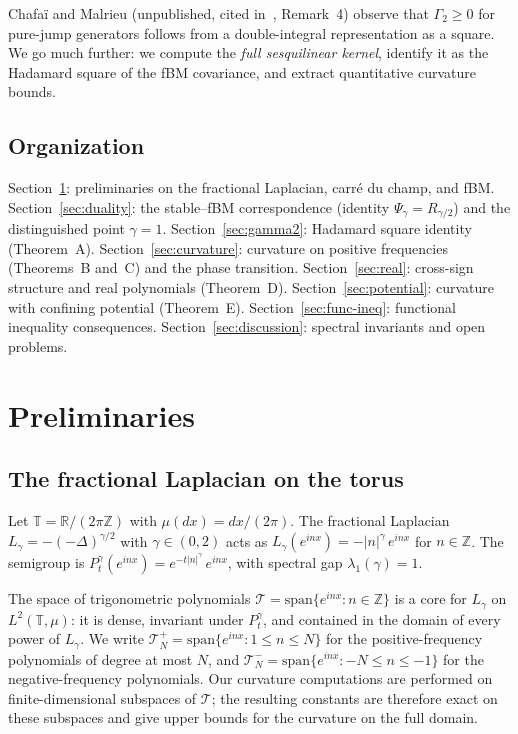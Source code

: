 \documentclass[11pt,a4paper]{article}
\theoremstyle{plain}
\theoremstyle{definition}
\theoremstyle{remark}
\newcommand{\R}{\mathbb{R}}
\newcommand{\Z}{\mathbb{Z}}
\newcommand{\T}{\mathbb{T}}
\begin{document}
Chafa\"i and Malrieu (unpublished, cited in~\cite{GentilImbert2008},
Remark~4) observe that $\Gamma_2 \geq 0$ for pure-jump generators
follows from a double-integral representation as a square. We go
much further: we compute the \emph{full sesquilinear kernel}, identify
it as the Hadamard square of the fBM covariance, and extract
quantitative curvature bounds.


\subsection{Organization}

Section~\ref{sec:prelim}: preliminaries on the fractional Laplacian,
carr\'e du champ, and fBM.
Section~\ref{sec:duality}: the stable--fBM correspondence (identity
$\Psi_\gamma = R_{\gamma/2}$) and the distinguished point $\gamma = 1$.
Section~\ref{sec:gamma2}: Hadamard square identity (Theorem~A).
Section~\ref{sec:curvature}: curvature on positive frequencies
(Theorems~B and~C) and the phase transition.
Section~\ref{sec:real}: cross-sign structure and real polynomials
(Theorem~D).
Section~\ref{sec:potential}: curvature with confining potential
(Theorem~E).
Section~\ref{sec:func-ineq}: functional inequality consequences.
Section~\ref{sec:discussion}: spectral invariants and open problems.


\section{Preliminaries}\label{sec:prelim}

\subsection{The fractional Laplacian on the torus}

Let $\T = \R/(2\pi\Z)$ with $\mu(dx) = dx/(2\pi)$. The fractional
Laplacian $L_\gamma = -(-\Delta)^{\gamma/2}$ with $\gamma \in (0,2)$
acts as $L_\gamma(e^{inx}) = -|n|^\gamma\,e^{inx}$ for $n \in \Z$.
The semigroup is $P_t^\gamma(e^{inx}) = e^{-t|n|^\gamma}\,e^{inx}$,
with spectral gap $\lambda_1(\gamma) = 1$.

The space of trigonometric polynomials
$\mathcal{T} = \mathrm{span}\{e^{inx} : n \in \Z\}$ is a core
for $L_\gamma$ on $L^2(\T,\mu)$: it is dense, invariant under $P_t^\gamma$,
and contained in the domain of every power of $L_\gamma$.
We write $\mathcal{T}_N^+ = \mathrm{span}\{e^{inx} : 1 \leq n \leq N\}$
for the positive-frequency polynomials of degree at most $N$,
and $\mathcal{T}_N^- = \mathrm{span}\{e^{inx} : -N \leq n \leq -1\}$
for the negative-frequency polynomials.
Our curvature computations are performed on finite-dimensional
subspaces of $\mathcal{T}$; the resulting constants are therefore
exact on these subspaces and give upper bounds for the curvature
on the full domain.
\end{document}
